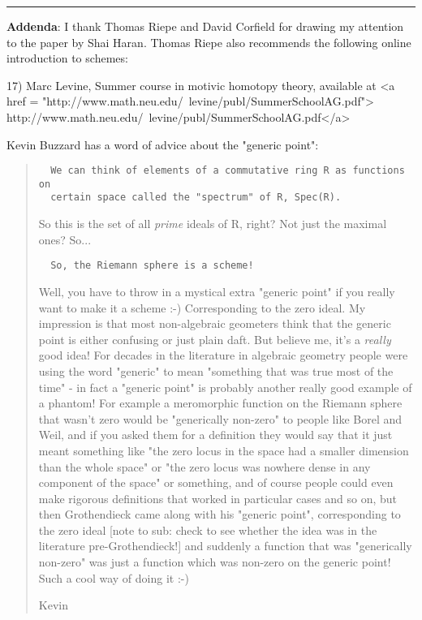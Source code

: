 \par\noindent\rule{\textwidth}{0.4pt}
\textbf{Addenda}: I thank Thomas Riepe and David Corfield for drawing my
attention to the paper by Shai Haran.  Thomas Riepe also recommends
the following online introduction to schemes:

17) Marc Levine, Summer course in motivic homotopy theory, available at 
<a href = "http://www.math.neu.edu/~levine/publ/SummerSchoolAG.pdf">
http://www.math.neu.edu/~levine/publ/SummerSchoolAG.pdf</a>

Kevin Buzzard has a word of advice about the "generic point":

\begin{quote}

\begin{verbatim}
  We can think of elements of a commutative ring R as functions on
  certain space called the "spectrum" of R, Spec(R).
\end{verbatim}
    

So this is the set of all \emph{prime} ideals of R, right? Not just
the maximal ones? So...

\begin{verbatim}
  So, the Riemann sphere is a scheme!
\end{verbatim}
    

Well, you have to throw in a mystical extra "generic point" if you really
want to make it a scheme :-) Corresponding to the zero ideal. My
impression is that most non-algebraic geometers think that the generic
point is either confusing or just plain daft. But believe me, it's a
\emph{really} good idea! For decades in the literature in algebraic geometry
people were using the word "generic" to mean "something that was true most
of the time" - in fact a "generic point" is probably another really good
example of a phantom! For example a meromorphic function on the Riemann
sphere that wasn't zero would be "generically non-zero" to people like
Borel and Weil, and if you asked them for a definition they would say
that it just meant something like "the zero locus in the space had a
smaller dimension than the whole space" or "the zero locus was
nowhere dense in any component of the space" or something, and of course
people could even make rigorous definitions that worked in particular
cases and so on, but then Grothendieck came along with his "generic
point", corresponding to the zero ideal [note to sub: check to see whether the
idea was in the literature pre-Grothendieck!] and suddenly a function that
was "generically non-zero" was just a function which was non-zero on the
generic point! Such a cool way of doing it :-)

Kevin
\end{quote}

